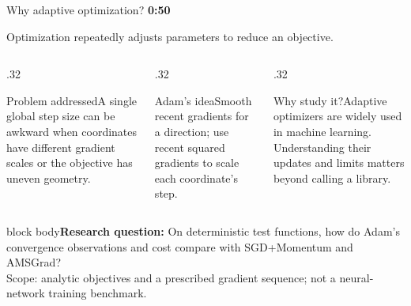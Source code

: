 \documentclass[aspectratio=169,10pt]{beamer}
\newcommand{\timing}[1]{\hfill{\color{teal}\scriptsize\bfseries #1}}
\begin{document}
\begin{frame}{Why adaptive optimization? \timing{0:50}}
\begin{center}{\large Optimization repeatedly adjusts parameters to reduce an objective.}\end{center}\vspace{.2cm}
\begin{columns}[T,onlytextwidth]
\begin{column}{.32\textwidth}\begin{block}{Problem addressed}\small A single global step size can be awkward when coordinates have different gradient scales or the objective has uneven geometry.\end{block}\end{column}
\begin{column}{.32\textwidth}\begin{block}{Adam's idea}\small Smooth recent gradients for a direction; use recent squared gradients to scale each coordinate's step.\end{block}\end{column}
\begin{column}{.32\textwidth}\begin{block}{Why study it?}\small Adaptive optimizers are widely used in machine learning. Understanding their updates and limits matters beyond calling a library.\end{block}\end{column}
\end{columns}\vspace{.25cm}
\begin{beamercolorbox}[rounded=true,sep=.65em,wd=\textwidth]{block body}\textbf{Research question:} On deterministic test functions, how do Adam's convergence observations and cost compare with SGD+Momentum and AMSGrad?\\[.25em]\textcolor{muted}{Scope: analytic objectives and a prescribed gradient sequence; not a neural-network training benchmark.}\end{beamercolorbox}
\end{frame}
\end{document}
